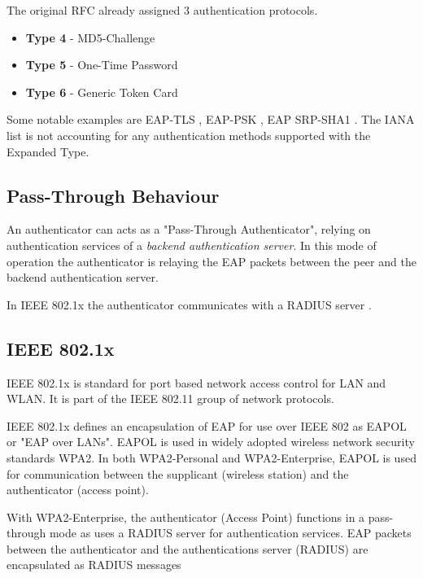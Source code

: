 The original RFC \cite{aboba2004extensible} already assigned 3 authentication protocols.

\begin{itemize}
	\item \textbf{Type 4} - MD5-Challenge
	\item \textbf{Type 5} - One-Time Password
	\item \textbf{Type 6} - Generic Token Card
\end{itemize}

Some notable examples are EAP-TLS \cite{simon2008eap}, EAP-PSK \cite{bersani2007eap}, EAP SRP-SHA1 \cite{carlson135eap}. %
The IANA list is not accounting for any authentication methods supported with the Expanded Type.


\subsection{Pass-Through Behaviour}
An authenticator can acts as a "Pass-Through Authenticator", relying on authentication services of a \textit{backend authentication server}. 
In this mode of operation the authenticator is relaying the EAP packets between the peer and the backend authentication server.

In IEEE 802.1x the authenticator communicates with a RADIUS server \cite{congdon2003ieee}.

\subsection{IEEE 802.1x}

IEEE 802.1x is standard for port based network access control for LAN and WLAN. It is part of the IEEE 802.11 group of network protocols.

IEEE 802.1x defines an encapsulation of EAP for use over IEEE 802 as EAPOL or "EAP over LANs".
EAPOL is used in widely adopted wireless network security standards WPA2. In both WPA2-Personal and WPA2-Enterprise, EAPOL is used for communication between the supplicant (wireless station) and the authenticator (access point).

With WPA2-Enterprise, the authenticator (Access Point) functions in a pass-through mode as uses a RADIUS server for authentication services. 
EAP packets between the authenticator and the authentications server (RADIUS) are encapsulated as RADIUS messages \cite{aboba2003radius, chen2005extensible, congdon2003ieee}